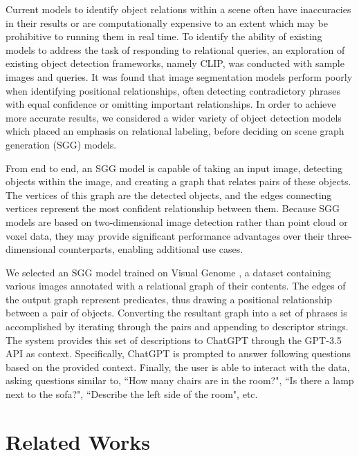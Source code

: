 \documentclass[letterpaper, 10 pt, conference]{ieeeconf}  %
\begin{document}
    Current models to identify object relations within a scene often have inaccuracies in their results or are computationally expensive to an extent which may be prohibitive to running them in real time. To identify the ability of existing models to address the task of responding to relational queries, an exploration of existing object detection frameworks, namely CLIP, was conducted with sample images and queries. It was found that image segmentation models perform poorly when identifying positional relationships, often detecting contradictory phrases with equal confidence or omitting important relationships. In order to achieve more accurate results, we considered a wider variety of object detection models which placed an emphasis on relational labeling, before deciding on scene graph generation (SGG) models.
    
    From end to end, an SGG model is capable of taking an input image, detecting objects within the image, and creating a graph that relates pairs of these objects. The vertices of this graph are the detected objects, and the edges connecting vertices represent the most confident relationship between them. Because SGG models are based on two-dimensional image detection rather than point cloud or voxel data, they may provide significant performance advantages over their three-dimensional counterparts, enabling additional use cases.
    
    We selected an SGG model trained on Visual Genome \cite{Krishna_Zhu_Groth_Johnson_Hata_Kravitz_Chen_Kalantidis_Li_Shamma_et_al._2017}, a dataset containing various images annotated with a relational graph of their contents. The edges of the output graph represent predicates, thus drawing a positional relationship between a pair of objects. Converting the resultant graph into a set of phrases is accomplished by iterating through the pairs and appending to descriptor strings. The system provides this set of descriptions to ChatGPT through the GPT-3.5 API as context. Specifically, ChatGPT is prompted to answer following questions based on the provided context. Finally, the user is able to interact with the data, asking questions similar to, ``How many chairs are in the room?", ``Is there a lamp next to the sofa?", ``Describe the left side of the room", etc.


\section{Related Works}
    
\end{document}
